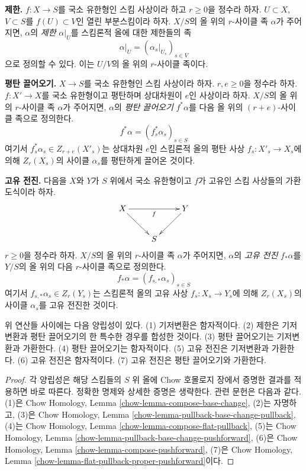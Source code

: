 \medskip\noindent
{\bf 제한.} $f : X \to S$를 국소 유한형인 스킴 사상이라 하고
$r \geq 0$을 정수라 하자. $U \subset X$, $V \subset S$를
$f(U) \subset V$인 열린 부분스킴이라 하자. $X/S$의 올 위의
$r$-사이클 족 $\alpha$가 주어지면, $\alpha$의 {\it 제한}
$\alpha|_U$를 스킴론적 올에 대한 제한들의 족
$$
\alpha|_U = (\alpha_s|_{U_s})_{s \in V}
$$
으로 정의할 수 있다. 이는 $U/V$의 올 위의 $r$-사이클 족이다.

\medskip\noindent
{\bf 평탄 끌어오기.} $X \to S$를 국소 유한형인 스킴 사상이라
하자. $r, e \geq 0$을 정수라 하자. $f : X' \to X$를 국소
유한형이고 평탄하며 상대차원이 $e$인 사상이라 하자. $X/S$의
올 위의 $r$-사이클 족 $\alpha$가 주어지면, $\alpha$의
{\it 평탄 끌어오기} $f^*\alpha$를 다음 올 위의 $(r + e)$-사이클
족으로 정의한다.
$$
f^*\alpha = (f_s^*\alpha_s)_{s \in S}
$$
여기서 $f_s^*\alpha_s \in Z_{r + e}(X'_s)$는 상대차원 $e$인 스킴론적
올의 평탄 사상 $f_s : X'_s \to X_s$에 의해 $Z_r(X_s)$의 사이클
$\alpha_s$를 평탄하게 끌어온 것이다.

\medskip\noindent
{\bf 고유 전진.} 다음을 $X$와 $Y$가 $S$ 위에서 국소 유한형이고
$f$가 고유인 스킴 사상들의 가환 도식이라 하자.
$$
\xymatrix{
X \ar[rr]_f \ar[rd] & & Y \ar[ld] \\
& S
}
$$
$r \geq 0$을 정수라 하자. $X/S$의 올 위의 $r$-사이클 족
$\alpha$가 주어지면, $\alpha$의 {\it 고유 전진} $f_*\alpha$를
$Y/S$의 올 위의 다음 $r$-사이클 족으로 정의한다.
$$
f_*\alpha = (f_{s, *}\alpha_s)_{s \in S}
$$
여기서 $f_{s, *}\alpha_s \in Z_r(Y_s)$는 스킴론적 올의 고유 사상
$f_s : X_s \to Y_s$에 의해 $Z_r(X_s)$의 사이클 $\alpha_s$를
고유 전진한 것이다.

\begin{lemma}
\label{lemma-compatibilities}
위 연산들 사이에는 다음 양립성이 있다.
(1) 기저변환은 함자적이다.
(2) 제한은 기저변환과 평탄 끌어오기의 한 특수한 경우를 합성한 것이다.
(3) 평탄 끌어오기는 기저변환과 가환한다.
(4) 평탄 끌어오기는 함자적이다.
(5) 고유 전진은 기저변환과 가환한다.
(6) 고유 전진은 함자적이다.
(7) 고유 전진은 평탄 끌어오기와 가환한다.
\end{lemma}

\begin{proof}
각 양립성은 해당 스킴들의 $S$ 위 올에 Chow 호몰로지 장에서 증명한
결과를 적용하면 바로 따른다. 정확한 명제와 상세한 증명은 생략한다.
관련 문헌은 다음과 같다. (1)은 Chow Homology, Lemma
\ref{chow-lemma-compose-base-change}, (2)는 자명하고, (3)은 Chow Homology,
Lemma \ref{chow-lemma-pullback-base-change-pullback}, (4)는 Chow Homology,
Lemma \ref{chow-lemma-compose-flat-pullback}, (5)는 Chow Homology, Lemma
\ref{chow-lemma-pullback-base-change-pushforward}, (6)은 Chow Homology,
Lemma \ref{chow-lemma-compose-pushforward}, (7)은 Chow Homology, Lemma
\ref{chow-lemma-flat-pullback-proper-pushforward}이다.
\end{proof}

